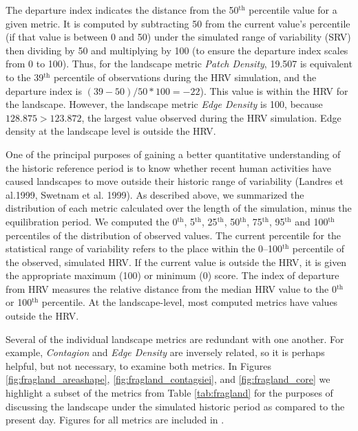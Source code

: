 The departure index indicates the distance from the 50$^{\text{th}}$ percentile value for a given metric. It is computed by subtracting 50 from the current value's percentile (if that value is between 0 and 50) under the simulated range of variability (SRV) then dividing by 50 and multiplying by 100 (to ensure the departure index scales from 0 to 100). Thus, for the landscape metric \emph{Patch Density}, 19.507 is equivalent to the 39$^{\text{th}}$ percentile of observations during the HRV simulation, and the departure index is $(39-50)/50*100 = -22$). This value is within the HRV for the landscape. However, the landscape metric \emph{Edge Density} is 100, because $128.875 > 123.872$, the largest value observed during the HRV simulation. Edge density at the landscape level is outside the HRV.

One of the principal purposes of gaining a better quantitative understanding of the historic reference period is to know whether recent human activities have caused landscapes to move outside their historic range of variability (Landres et al.1999, Swetnam et al. 1999). As described above, we summarized the distribution of each metric calculated over the length of the simulation, minus the equilibration period. We computed the 0$^{\text{th}}$, 5$^{\text{th}}$, 25$^{\text{th}}$, 50$^{\text{th}}$, 75$^{\text{th}}$, 95$^{\text{th}}$ and 100$^{\text{th}}$ percentiles of the distribution of observed values. The current percentile for the statistical range of variability refers to the place within the 0--100$^{\text{th}}$ percentile of the observed, simulated HRV. If the current value is outside the HRV, it is given the appropriate maximum (100) or minimum (0) score. The index of departure from HRV measures the relative distance from the median HRV value to the 0$^{\text{th}}$ or 100$^{\text{th}}$ percentile. At the landscape-level, most computed metrics have values outside the HRV. 

Several of the individual landscape metrics are redundant with one another. For example, \emph{Contagion} and \emph{Edge Density} are inversely related, so it is perhaps helpful, but not necessary, to examine both metrics. In Figures \ref{fig:fragland_areashape}, \ref{fig:fragland_contagsiei}, and \ref{fig:fragland_core} we highlight a subset of the metrics from Table \ref{tab:fragland} for the purposes of discussing the landscape under the simulated historic period as compared to the present day. Figures for all metrics are included in .


